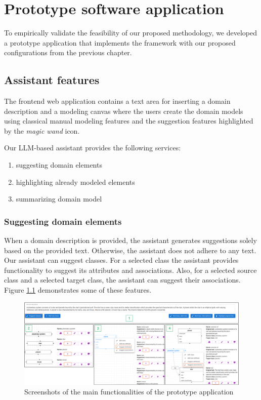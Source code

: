 \chapter{Prototype software application}
\label{chap:protype_software_application}

To empirically validate the feasibility of our proposed methodology, we developed a prototype application that implements the framework with our proposed configurations from the previous chapter.


\section{Assistant features}

The frontend web application contains a text area for inserting a domain description and a modeling canvas where the users create the domain models using classical manual modeling features and the suggestion features highlighted by the \textit{magic wand} icon.

Our LLM-based assistant provides the following services:

\begin{enumerate}
\item suggesting domain elements
\item highlighting already modeled elements
\item summarizing domain model
\end{enumerate}


\subsection{Suggesting domain elements}

When a domain description is provided, the assistant generates suggestions solely based on the provided text. Otherwise, the assistant does not adhere to any text. Our assistant can suggest classes. For a selected class the assistant provides functionality to suggest its attributes and associations. Also, for a selected source class and a selected target class, the assistant can suggest their associations. Figure \ref{fig:assistant-features} demonstrates some of these features.

\begin{figure}[!h]
    \centering
    \includegraphics[scale=0.22]{img/assistant-features.png}
    \caption{\centering Screenshots of the main functionalities of the prototype application}
    \label{fig:assistant-features}
\end{figure}


